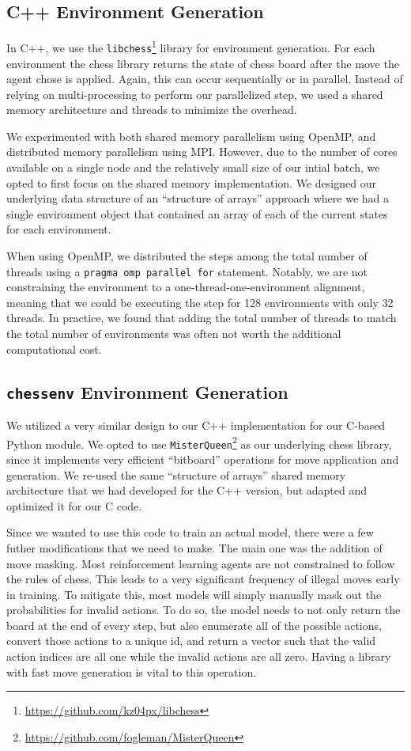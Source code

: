 \documentclass[12pt]{article}
\begin{document}
\subsection{C++ Environment Generation}\label{subsec:cpp-environment}

In C++, we use the \texttt{libchess}\footnote{\url{https://github.com/kz04px/libchess}} library for environment generation. For each environment the chess library returns the state of chess board after the move the agent chose is applied. Again, this can occur sequentially or in parallel. Instead of relying on multi-processing to perform our parallelized step, we used a shared memory architecture and threads to minimize the overhead. 

We experimented with both shared memory parallelism using OpenMP, and distributed memory parallelism using MPI. However, due to the number of cores available on a single node and the relatively small size of our intial batch, we opted to first focus on the shared memory implementation. We designed our underlying data structure of an ``structure of arrays'' approach where we had a single environment object that contained an array of each of the current states for each environment. 

When using OpenMP, we distributed the steps among the total number of threads using a \texttt{pragma omp parallel for} statement. Notably, we are not constraining the environment to a one-thread-one-environment alignment, meaning that we could be executing the step for 128 environments with only 32 threads. In practice, we found that adding the total number of threads to match the total number of environments was often not worth the additional computational cost.

\subsection{\texttt{chessenv} Environment Generation}\label{subsec:chessenv}

We utilized a very similar design to our C++ implementation for our C-based Python module. We opted to use \texttt{MisterQueen}\footnote{\url{https://github.com/fogleman/MisterQueen}} as our underlying chess library, since it implements very efficient ``bitboard'' operations for move application and generation. We re-used the same ``structure of arrays'' shared memory architecture that we had developed for the C++ version, but adapted and optimized it for our C code.

Since we wanted to use this code to train an actual model, there were a few futher modifications that we need to make. The main one was the addition of move masking. Most reinforcement learning agents are not constrained to follow the rules of chess. This leads to a very significant frequency of illegal moves early in training. To mitigate this, most models will simply manually mask out the probabilities for invalid actions. To do so, the model needs to not only return the board at the end of every step, but also enumerate all of the possible actions, convert those actions to a unique id, and return a vector such that the valid action indices are all one while the invalid actions are all zero. Having a library with fast move generation is vital to this operation.
\end{document}
